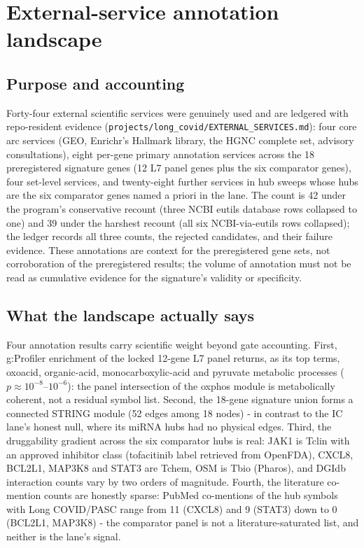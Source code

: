 \documentclass[11pt,a4paper]{article}
\begin{document}
\section{External-service annotation landscape}
\subsection{Purpose and accounting}
Forty-four external scientific services were genuinely used and are ledgered
with repo-resident evidence (\texttt{projects/long\_covid/EXTERNAL\_SERVICES.md}):
four core arc services (GEO, Enrichr's Hallmark library, the HGNC complete
set, advisory consultations), eight per-gene primary annotation services
across the 18 preregistered signature genes (12 L7 panel genes plus the six
comparator genes), four set-level services, and twenty-eight further services
in hub sweeps whose hubs are the six comparator genes named a priori in the
lane. The count is 42 under the program's conservative recount (three NCBI
eutils database rows collapsed to one) and 39 under the harshest recount (all
six NCBI-via-eutils rows collapsed); the ledger records all three counts, the
rejected candidates, and their failure evidence. These annotations are
context for the preregistered gene sets, not corroboration of the
preregistered results; the volume of annotation must not be read as
cumulative evidence for the signature's validity or specificity.

\subsection{What the landscape actually says}
Four annotation results carry scientific weight beyond gate accounting.
First, g:Profiler enrichment of the locked 12-gene L7 panel returns, as its
top terms, oxoacid, organic-acid, monocarboxylic-acid and pyruvate metabolic
processes ($p\approx10^{-8}$--$10^{-6}$): the panel intersection of the
oxphos module is metabolically coherent, not a residual symbol list.
Second, the 18-gene signature union forms a connected STRING module (52
edges among 18 nodes) - in contrast to the IC lane's honest null, where its
miRNA hubs had no physical edges. Third, the druggability gradient across the
six comparator hubs is real: JAK1 is Tclin with an approved inhibitor class
(tofacitinib label retrieved from OpenFDA), CXCL8, BCL2L1, MAP3K8 and STAT3
are Tchem, OSM is Tbio (Pharos), and DGIdb interaction counts vary by two
orders of magnitude. Fourth, the literature co-mention counts are honestly
sparse: PubMed co-mentions of the hub symbols with Long COVID/PASC range from
11 (CXCL8) and 9 (STAT3) down to 0 (BCL2L1, MAP3K8) - the comparator panel is
not a literature-saturated list, and neither is the lane's signal.
\end{document}
